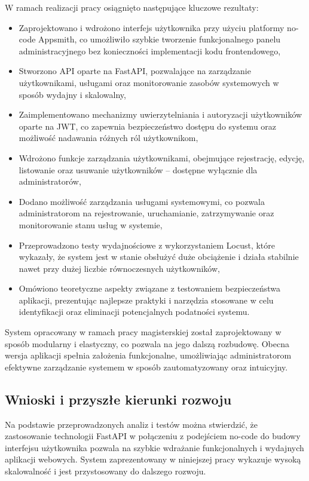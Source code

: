 W ramach realizacji pracy osiągnięto następujące kluczowe rezultaty:
\begin{itemize}
    \item Zaprojektowano i wdrożono interfejs użytkownika przy użyciu platformy no-code Appsmith, co umożliwiło szybkie tworzenie funkcjonalnego panelu administracyjnego bez konieczności implementacji kodu frontendowego,
    \item Stworzono API oparte na FastAPI, pozwalające na zarządzanie użytkownikami, usługami oraz monitorowanie zasobów systemowych w sposób wydajny i skalowalny,
    \item Zaimplementowano mechanizmy uwierzytelniania i autoryzacji użytkowników oparte na JWT, co zapewnia bezpieczeństwo dostępu do systemu oraz możliwość nadawania różnych ról użytkownikom,
    \item Wdrożono funkcje zarządzania użytkownikami, obejmujące rejestrację, edycję, listowanie oraz usuwanie użytkowników – dostępne wyłącznie dla administratorów,
    \item Dodano możliwość zarządzania usługami systemowymi, co pozwala administratorom na rejestrowanie, uruchamianie, zatrzymywanie oraz monitorowanie stanu usług w systemie,
    \item Przeprowadzono testy wydajnościowe z wykorzystaniem Locust, które wykazały, że system jest w stanie obsłużyć duże obciążenie i działa stabilnie nawet przy dużej liczbie równoczesnych użytkowników,
    \item Omówiono teoretyczne aspekty związane z testowaniem bezpieczeństwa aplikacji, prezentując najlepsze praktyki i narzędzia stosowane w celu identyfikacji oraz eliminacji potencjalnych podatności systemu.
\end{itemize}

System opracowany w ramach pracy magisterskiej został zaprojektowany w sposób modularny i elastyczny, co pozwala na jego dalszą rozbudowę. Obecna wersja aplikacji spełnia założenia funkcjonalne, umożliwiając administratorom efektywne zarządzanie systemem w sposób zautomatyzowany oraz intuicyjny.

\subsection{Wnioski i przyszłe kierunki rozwoju}

Na podstawie przeprowadzonych analiz i testów można stwierdzić, że zastosowanie technologii FastAPI w połączeniu z podejściem no-code do budowy interfejsu użytkownika pozwala na szybkie wdrażanie funkcjonalnych i wydajnych aplikacji webowych. System zaprezentowany w niniejszej pracy wykazuje wysoką skalowalność i jest przystosowany do dalszego rozwoju.

